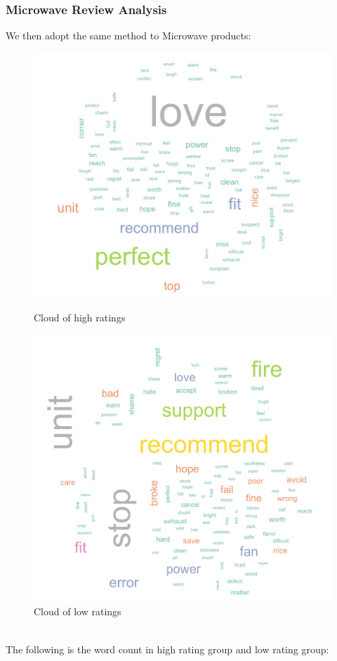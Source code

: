 \documentclass[12pt]{article}
\begin{document}
\subsubsection{Microwave Review Analysis}
We then adopt the same method to Microwave products:
\begin{figure}[!htb]
   \begin{minipage}{0.48\textwidth}
     \centering
     \includegraphics[width=.8\linewidth]{micro45.jpeg}
     \caption{Cloud of high ratings}\label{Fig:4,5}
   \end{minipage}\hfill
   \begin{minipage}{0.48\textwidth}
     \centering
     \includegraphics[width=.8\linewidth]{micro12.jpeg}
     \caption{Cloud of low ratings}\label{Fig:1,2}
   \end{minipage}
\end{figure} \\
The following is the word count in high rating group and low rating group:
\end{document}
